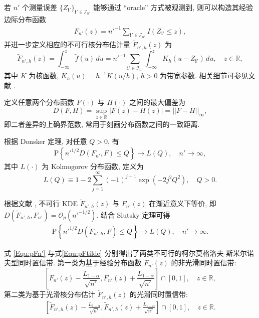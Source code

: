 \documentclass[a4paper,openay,14pt]{ctexbook}
\numberwithin{equation}{section}
\numberwithin{lem}{section}
\begin{document}
若 $n'$ 个测量误差 $\{Z_{\mathbf{i}'}\}_{\mathbf{i}' \in \mathcal{I}_{n'}}$ 能够通过 ``oracle'' 方式被观测到, 则可以构造其经验边际分布函数
\begin{align*}
F_{n'}(z) = n'^{-1} \sum_{\mathbf{i}' \in \mathcal{I}_{n'}} I\left(Z_{\mathbf{i}'} \le z\right),
\end{align*}
并进一步定义相应的不可行核分布估计量 $\tilde{F}_{n',h}(z)$ 为
\begin{equation}\label{EQ:Fn'tilde}
\tilde{F}_{n',h}(z)
= \int_{-\infty}^{z} \tilde{f}(u) \, du
= n'^{-1} \sum_{\mathbf{i}' \in \mathcal{I}_{n'}}
\int_{-\infty}^{z} K_h(u - Z_{\mathbf{i}'}) \, du, 
\quad z \in \mathbb{R},
\end{equation}
其中 $K$ 为核函数, $K_h(u) = h^{-1} K(u/h)$, $h>0$ 为带宽参数. 相关细节可参见文献 \cite{wang2013smooth}.

定义任意两个分布函数 $F(\cdot)$ 与 $H(\cdot)$ 之间的最大偏差为
\begin{equation}\label{EQ:D(F,H)}
D(F,H) = \sup_{z \in \mathbb{R}} |F(z) - H(z)| = ||F - H||_{\infty},
\end{equation}
即二者差异的上确界范数, 常用于刻画分布函数之间的一致距离.

根据 Donsker 定理, 对任意 $Q>0$, 有
\begin{align}\label{Equ:pFn'}
\mathrm{P}\left\{ n'^{1/2} D\left(F_{n'}, F\right) \le Q \right\}
\rightarrow L(Q), \quad n' \rightarrow \infty,
\end{align}
其中 $L(\cdot)$ 为 Kolmogorov 分布函数, 定义为
\[
L(Q) \equiv 1 - 2 \sum_{j=1}^{\infty} (-1)^{j-1} \exp\left(-2 j^2 Q^2\right), 
\quad Q>0.
\]

根据文献 \cite{wang2013smooth}, 不可行 KDE $\tilde{F}_{n',h}(z)$ 与 $F_{n'}(z)$ 在渐近意义下等价, 即
$D(\tilde{F}_{n',h}, F_{n'}) = \mathcal{O}_p(n'^{-1/2})$. 结合 Slutsky 定理可得
\begin{align}\label{Equ:pFtilde}
\mathrm{P}\left\{ n'^{1/2} D\left(\tilde{F}_{n',h}, F\right) \le Q \right\}
\rightarrow L(Q), \quad n' \rightarrow \infty.
\end{align}

式 \eqref{Equ:pFn'} 与式\eqref{Equ:pFtilde} 分别得出了两类不可行的柯尔莫格洛夫-斯米尔诺夫型同时置信带. 第一类为基于经验分布函数 $F_{n'}(z)$ 的非光滑同时置信带:
\[
\left[
F_{n'}(z) - \frac{L_{1-\alpha}}{\sqrt{n'}},
F_{n'}(z) + \frac{L_{1-\alpha}}{\sqrt{n'}}
\right] \cap [0,1], 
\quad z \in \mathbb{R},
\]
第二类为基于光滑核分布估计 $\tilde{F}_{n',h}(z)$ 的光滑同时置信带:
\begin{align} \label{SCB:Ftilden'}
    \left[ \tilde{F}_{n',h}(z) - \frac{L_{1-\alpha}}{\sqrt{n'}},\tilde{F}_{n',h}(z) + \frac{L_{1-\alpha}}{\sqrt{n'}} \right] \cap [0,1], \quad z \in \mathbb{R}.
\end{align}
\end{document}
